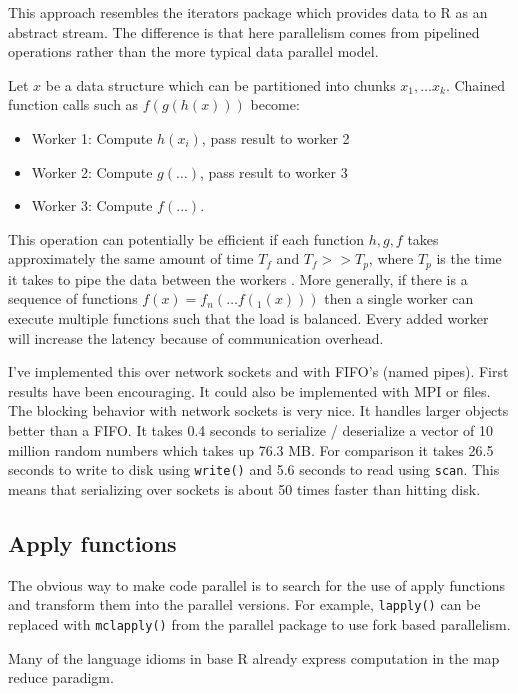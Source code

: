 \documentclass[12pt]{article}
\begin{document}
This approach resembles the iterators package \cite{R-iterators} which
provides data to R as an abstract stream. The difference is that here
parallelism comes from pipelined operations rather than the more typical
data parallel model.

Let $x$ be a data structure which can be partitioned into chunks $x_1,
\dots x_k$. Chained function calls such as $f(g(h(x)))$ become:

\begin{itemize}
    \item Worker 1: Compute $h(x_i)$, pass result to worker 2
    \item Worker 2: Compute $g(\dots)$, pass result to worker 3
    \item Worker 3: Compute $f(\dots)$.
\end{itemize}

This operation can potentially be efficient if each function $h, g,
f$ takes approximately the same amount of time $T_f$ and $T_f >> T_p$,
where $T_p$ is the time it takes to pipe the data between the 
workers \cite{arnold2015iotools}. More generally, if there is a sequence of
functions $f(x) = f_n(\dots f(_1(x)))$ then a single worker can execute
multiple functions such that the load is balanced. Every added worker will
increase the latency because of communication overhead.

I've implemented this over network sockets and with FIFO's (named pipes).
First results have been encouraging.  It could also be implemented with MPI
or files.  The blocking behavior with network sockets is very nice. It
handles larger objects better than a FIFO.  It takes 0.4 seconds to
serialize / deserialize a vector of 10 million random numbers which takes
up 76.3 MB.  For comparison it takes 26.5 seconds to write to disk using
\texttt{write()} and 5.6 seconds to read using \texttt{scan}.  This means
that serializing over sockets is about 50 times faster than hitting disk.

\subsection{Apply functions}

The obvious way to make code parallel is to search for the use of
apply functions and transform them into the parallel versions. For example, 
\texttt{lapply()} can be replaced with \texttt{mclapply()} from the
parallel package to use fork based parallelism.

Many of the language idioms in base R already express computation in the
map reduce paradigm.
\end{document}
